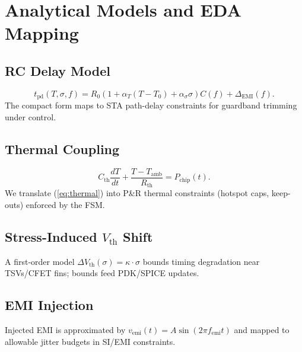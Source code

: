 \documentclass[conference]{IEEEtran}
\begin{document}
\section{Analytical Models and EDA Mapping}
\subsection{RC Delay Model}
\begin{equation}
t_{\mathrm{pd}}(T,\sigma,f) =
R_0\!\left(1+\alpha_T(T-T_0)+\alpha_\sigma\sigma\right) C(f)
+ \Delta_{\mathrm{EMI}}(f).
\label{eq:rc}
\end{equation}
The compact form maps to STA path-delay constraints for guardband trimming under control.

\subsection{Thermal Coupling}
\begin{equation}
C_{\mathrm{th}}\frac{dT}{dt} + \frac{T-T_{\mathrm{amb}}}{R_{\mathrm{th}}} = P_{\mathrm{chip}}(t).
\label{eq:thermal}
\end{equation}
We translate (\ref{eq:thermal}) into P\&R thermal constraints (hotspot caps, keep-outs) enforced by the FSM.

\subsection{Stress-Induced $V_{\mathrm{th}}$ Shift}
A first-order model $\Delta V_{\mathrm{th}}(\sigma)=\kappa\cdot\sigma$ bounds timing degradation near TSVs/CFET fins; bounds feed PDK/SPICE updates.

\subsection{EMI Injection}
Injected EMI is approximated by $v_{\mathrm{emi}}(t)=A\sin(2\pi f_{\mathrm{emi}}t)$ and mapped to allowable jitter budgets in SI/EMI constraints.

\end{document}

